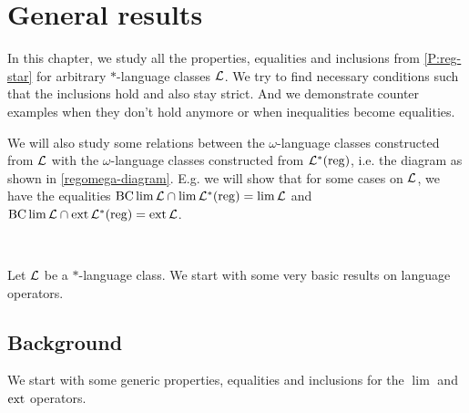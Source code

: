 \section{General results}
\label{general-results}

In this chapter, we study all the properties, equalities and inclusions from \cref{P:reg-star} for arbitrary $*$-language classes $\mathcal{L}$. We try to find necessary conditions such that the inclusions hold and also stay strict. And we demonstrate counter examples when they don't hold anymore or when inequalities become equalities.

We will also study some relations between the $\omega$-language classes constructed from $\mathcal{L}$ with the $\omega$-language classes constructed from $\mathcal{L}^*(\textup{\textrm{reg}})$, i.e. the diagram as shown in \cref{regomega-diagram}. E.g. we will show that for some cases on $\mathcal{L}$, we have the equalities $\operatorname{BC} \lim \mathcal{L} \cap \lim \mathcal{L}^*(\textup{\textrm{reg}}) = \lim \mathcal{L}$ and $\operatorname{BC} \lim \mathcal{L} \cap \operatorname{ext} \mathcal{L}^*(\textup{\textrm{reg}}) = \operatorname{ext} \mathcal{L}$.


\

Let $\mathcal{L}$ be a $*$-language class. We start with some very basic results on language operators.

\subsection{Background}
We start with some generic properties, equalities and inclusions for the $\lim$ and $\operatorname{ext}$ operators.


